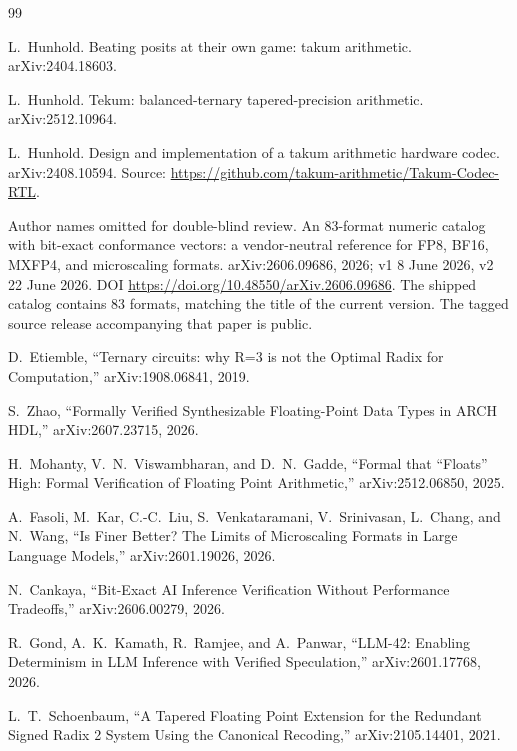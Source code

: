 \begin{thebibliography}{99}

L.~Hunhold.
\newblock Beating posits at their own game: takum arithmetic.
\newblock arXiv:2404.18603.

L.~Hunhold.
\newblock Tekum: balanced-ternary tapered-precision arithmetic.
\newblock arXiv:2512.10964.

L.~Hunhold.
\newblock Design and implementation of a takum arithmetic hardware codec.
\newblock arXiv:2408.10594. Source: \url{https://github.com/takum-arithmetic/Takum-Codec-RTL}.

Author names omitted for double-blind review.
\newblock An 83-format numeric catalog with bit-exact conformance vectors: a
vendor-neutral reference for FP8, BF16, MXFP4, and microscaling formats.
\newblock arXiv:2606.09686, 2026; v1 8 June 2026, v2 22 June 2026.
\newblock DOI \url{https://doi.org/10.48550/arXiv.2606.09686}.
\newblock The shipped catalog contains 83 formats, matching the title of the
current version. The tagged source release accompanying that paper is public.

 D.~Etiemble, ``Ternary circuits: why R=3 is not the
Optimal Radix for Computation,'' arXiv:1908.06841, 2019.

 S.~Zhao, ``Formally Verified Synthesizable Floating-Point
Data Types in ARCH HDL,'' arXiv:2607.23715, 2026.

 H.~Mohanty, V.~N.~Viswambharan, and D.~N.~Gadde, ``Formal
that ``Floats'' High: Formal Verification of Floating Point Arithmetic,''
arXiv:2512.06850, 2025.

 A.~Fasoli, M.~Kar, C.-C.~Liu, S.~Venkataramani,
V.~Srinivasan, L.~Chang, and N.~Wang, ``Is Finer Better? The Limits of
Microscaling Formats in Large Language Models,'' arXiv:2601.19026, 2026.

 N.~Cankaya, ``Bit-Exact AI Inference Verification Without
Performance Tradeoffs,'' arXiv:2606.00279, 2026.

 R.~Gond, A.~K.~Kamath, R.~Ramjee, and A.~Panwar,
``LLM-42: Enabling Determinism in LLM Inference with Verified Speculation,''
arXiv:2601.17768, 2026.

 L.~T.~Schoenbaum, ``A Tapered Floating Point Extension
for the Redundant Signed Radix 2 System Using the Canonical Recoding,''
arXiv:2105.14401, 2021.


\end{thebibliography}
